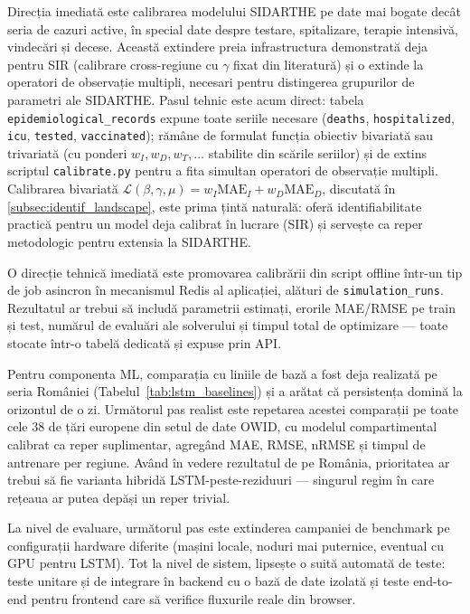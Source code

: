 Direcția imediată este calibrarea modelului SIDARTHE pe date mai bogate decât
seria de cazuri active, în special date despre testare, spitalizare, terapie
intensivă, vindecări și decese. Această extindere preia infrastructura
demonstrată deja pentru SIR (calibrare cross-regiune cu $\gamma$ fixat din
literatură) și o extinde la operatori de observație multipli, necesari pentru
distingerea grupurilor de parametri ale SIDARTHE. Pasul tehnic este acum
direct: tabela \texttt{epidemiological\_records} expune toate seriile
necesare (\texttt{deaths}, \texttt{hospitalized}, \texttt{icu},
\texttt{tested}, \texttt{vaccinated}); rămâne de formulat funcția obiectiv
bivariată sau trivariată (cu ponderi $w_I, w_D, w_T, \ldots$ stabilite din
scările seriilor) și de extins scriptul \texttt{calibrate.py} pentru a fita
simultan operatori de observație multipli. Calibrarea bivariată
$\mathcal{L}(\beta,\gamma,\mu) = w_I \mathrm{MAE}_I + w_D \mathrm{MAE}_D$,
discutată în \cref{subsec:identif_landscape}, este prima țintă naturală:
oferă identifiabilitate practică pentru un model deja calibrat în lucrare
(SIR) și servește ca reper metodologic pentru extensia la SIDARTHE.

O direcție tehnică imediată este promovarea calibrării din script offline într-un
tip de job asincron în mecanismul Redis al aplicației, alături de
\texttt{simulation\_runs}. Rezultatul ar trebui să includă parametrii estimați,
erorile MAE/RMSE pe train și test, numărul de evaluări ale solverului și timpul
total de optimizare --- toate stocate într-o tabelă dedicată și expuse prin API.

Pentru componenta ML, comparația cu liniile de bază a fost deja realizată pe
seria României (Tabelul~\ref{tab:lstm_baselines}) și a arătat că persistența
domină la orizontul de o zi. Următorul pas realist este repetarea acestei
comparații pe toate cele 38 de țări europene din setul de date OWID, cu modelul
compartimental calibrat ca reper suplimentar, agregând MAE, RMSE, nRMSE și timpul
de antrenare per regiune. Având în vedere rezultatul de pe România, prioritatea ar
trebui să fie varianta hibridă LSTM-peste-reziduuri --- singurul regim în care
rețeaua ar putea depăși un reper trivial.

La nivel de evaluare, următorul pas este extinderea campaniei de benchmark pe
configurații hardware diferite (mașini locale, noduri mai puternice, eventual
cu GPU pentru LSTM). Tot la nivel de sistem, lipsește o suită automată de
teste: teste unitare și de integrare în backend cu o bază de date izolată și
teste end-to-end pentru frontend care să verifice fluxurile reale din browser.

